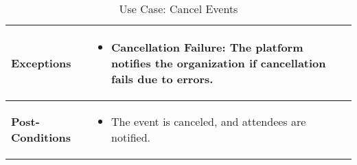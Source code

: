 \begin{table}[!ht]
\begin{tabularx}{\textwidth}{|l|X|}
        \hline
        \textbf{Exceptions} & 
        \begin{itemize}[label=--,itemsep=0pt]
            \item Cancellation Failure: The platform notifies the organization if cancellation fails due to errors.
        \end{itemize} \\
        \hline
        \textbf{Post-Conditions} & 
        \begin{itemize}[label=--,itemsep=0pt]
            \item The event is canceled, and attendees are notified.
        \end{itemize} \\
        \hline
    \end{tabularx}
    \caption{Use Case: Cancel Events}
    \label{tab:use-case-cancel-events}
\end{table}


